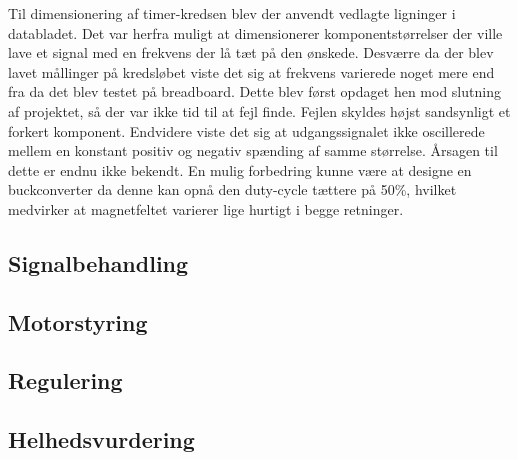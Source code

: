 Til dimensionering af timer-kredsen blev der anvendt vedlagte ligninger i databladet.
Det var herfra muligt at dimensionerer komponentstørrelser der ville lave et signal med en frekvens der lå tæt på den ønskede.
Desværre da der blev lavet mållinger på kredsløbet viste det sig at frekvens varierede noget mere end fra da det blev testet på breadboard.
Dette blev først opdaget hen mod slutning af projektet, så der var ikke tid til at fejl finde.
Fejlen skyldes højst sandsynligt et forkert komponent.
Endvidere viste det sig at udgangssignalet ikke oscillerede mellem en konstant positiv og negativ spænding af samme størrelse.
Årsagen til dette er endnu ikke bekendt.
En mulig forbedring kunne være at designe en buckconverter da denne kan opnå den duty-cycle tættere på 50\%, hvilket medvirker at magnetfeltet varierer lige hurtigt i begge retninger.

\subsection{Signalbehandling}

\subsection{Motorstyring}


\subsection{Regulering}



\subsection{Helhedsvurdering}

